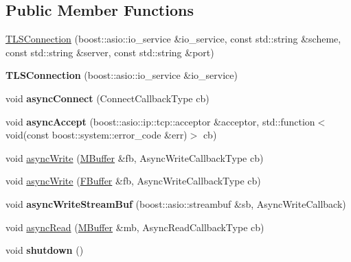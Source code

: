 \subsection*{Public Member Functions}
\begin{DoxyCompactItemize}
\item 
\hyperlink{class_t_l_s_connection_ac9ad86b89b6a327277962f43a11b542e}{T\+L\+S\+Connection} (boost\+::asio\+::io\+\_\+service \&io\+\_\+service, const std\+::string \&scheme, const std\+::string \&server, const std\+::string \&port)
\item 
\mbox{\label{class_t_l_s_connection_a3ee6b831efcf2674dc60ff29d9c5429d}} 
{\bfseries T\+L\+S\+Connection} (boost\+::asio\+::io\+\_\+service \&io\+\_\+service)
\item 
\mbox{\label{class_t_l_s_connection_a9fb660429140b86b36877afdbed4c1c0}} 
void {\bfseries async\+Connect} (Connect\+Callback\+Type cb)
\item 
\mbox{\label{class_t_l_s_connection_a18acf6d17737221d72ad83ad9ec12bc9}} 
void {\bfseries async\+Accept} (boost\+::asio\+::ip\+::tcp\+::acceptor \&acceptor, std\+::function$<$ void(const boost\+::system\+::error\+\_\+code \&err)$>$ cb)
\item 
void \hyperlink{class_t_l_s_connection_abcca8739e56387ddceeefd15f8ea0967}{async\+Write} (\hyperlink{struct_m_buffer}{M\+Buffer} \&fb, Async\+Write\+Callback\+Type cb)
\item 
void \hyperlink{class_t_l_s_connection_a986b8ea40c6708966dc5a499e18b39ae}{async\+Write} (\hyperlink{class_f_buffer}{F\+Buffer} \&fb, Async\+Write\+Callback\+Type cb)
\item 
\mbox{\label{class_t_l_s_connection_a5d7a765878b0087d3146cdc8fa97a5f5}} 
void {\bfseries async\+Write\+Stream\+Buf} (boost\+::asio\+::streambuf \&sb, Async\+Write\+Callback)
\item 
void \hyperlink{class_t_l_s_connection_a37ef49d562cad83c9cdb130f7196f0b5}{async\+Read} (\hyperlink{struct_m_buffer}{M\+Buffer} \&mb, Async\+Read\+Callback\+Type cb)
\item 
\mbox{\label{class_t_l_s_connection_aa8cac88c4c5108ab12c3f5399a3b630c}} 
void {\bfseries shutdown} ()
\item 

\end{DoxyCompactItemize}
